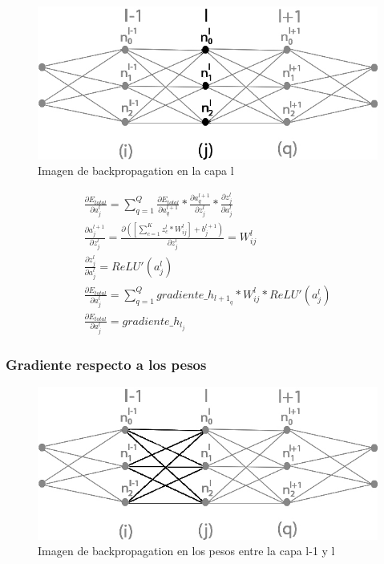 \begin{figure}[H]
	\centering
	\includegraphics[scale=0.35]{imagenes/conclusion_capa_l.jpg}  
	\caption{Imagen de backpropagation en la capa l}
	\label{fig:conclusion_capa_l}
\end{figure}

\begin{gather}
	\frac{\partial E_{total}}{\partial a^l_j} = \sum_{q=1}^Q \frac{\partial E_{total}}{\partial a^{l+1}_q} * \frac{\partial a^{l+1}_q}{\partial z^l_j} * \frac{\partial z^l_j}{\partial a^l_j} \\
	\frac{\partial a^{l+1}_j }{\partial z^l_j } = \frac{\partial ([\sum_{c=1}^{K} z^l_c * W^l_{ij}] + b^{l+1}_j) }{\partial z^l_j } = W^l_{ij} \\
	\frac{\partial z^l_j}{\partial a^l_j} = ReLU'(a^l_j) \\
	\frac{\partial E_{total}}{\partial a^l_j} = \sum_{q=1}^Q  gradiente\_h_{{l+1}_q} * W^l_{ij} * ReLU'(a^l_j) \\
	\frac{\partial E_{total}}{\partial a^l_j} = gradiente\_h_{l_j}
\end{gather}

\subsubsection{Gradiente respecto a los pesos}

\begin{figure}[H]
	\centering
	\includegraphics[scale=0.35]{imagenes/conclusion_pesos.jpg}  
	\caption{Imagen de backpropagation en los pesos entre la capa l-1 y l}
	\label{fig:conclusion_pesos}
\end{figure}

